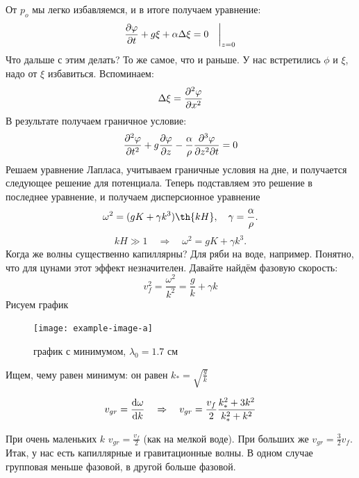 От $p_o$ мы легко избавляемся, и в итоге получаем уравнение:
\begin{equation}
    \pdv{\varphi}{t}+g\xi+\alpha\Delta\xi = 0 \quad\bigg|_{z = 0}
\end{equation}
Что дальше с этим делать? То же самое, что и раньше. У нас встретились $\phi$ и $\xi$, надо от $\xi$ избавиться. Вспоминаем:
\begin{equation}
    \Delta\xi = \pdv[2]{\varphi}{x}
\end{equation}
В результате получаем граничное условие:
\begin{equation}
    \pdv[2]{\varphi}{t}+g\pdv{\varphi}{z}-\frac{\alpha}{\rho}\frac{\partial^3\varphi}{\partial z^2 \partial t} = 0
\end{equation}
Решаем уравнение Лапласа, учитываем граничные условия на дне, и получается следующее решение для потенциала. Теперь подставляем это решение в последнее уравнение, и получаем дисперсионное уравнение
\begin{equation}
    \omega^2 = (gK+\gamma k^3)\th{kH}, \quad \gamma = \frac{\alpha}{\rho}.
\end{equation}
\begin{equation}
    kH \gg 1 \quad \Rightarrow \quad \omega^2 = gK+\gamma k^3.
\end{equation}
Когда же волны существенно капиллярны? Для ряби на воде, например. Понятно, что для цунами этот эффект незначителен. Давайте найдём фазовую скорость:
\begin{equation}
    v_f^2 = \frac{\omega^2}{k^2} = \frac{g}{k}+\gamma k 
\end{equation}
Рисуем график

\begin{figure}[H]
    \centering
    \texttt{[image: example-image-a]}
    \caption{график с минимумом, $\lambda_0 = 1.7 \text{ см}$}
    \label{fig:figure1}
\end{figure}

Ищем, чему равен минимум: он равен $k_{*} = \sqrt{\frac{g}{k}}$

\begin{equation}
    v_{gr} = \dv{\omega}{k} \quad \Rightarrow \quad 
    v_{gr} = \frac{v_f}{2}\frac{k_{*}^2+3k^2}{k_{*}^2+k^2}
\end{equation}

При очень маленьких $k$ $v_{gr} = \frac{v_f}{2}$ (как на мелкой воде). 
При больших же $v_{gr} = \frac{3}{2}v_f$.
Итак, у нас есть капиллярные и гравитационные волны.
В одном случае групповая меньше фазовой, в другой больше фазовой. 

